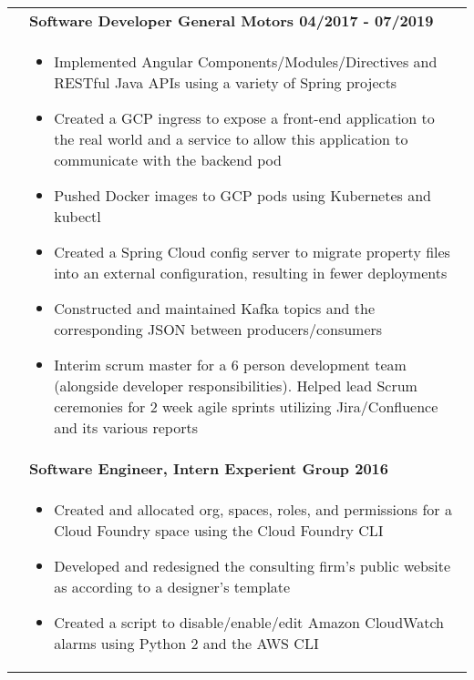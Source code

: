 \documentclass[final]{letter}
\begin{document}
\begin{center}
\begin{tabularx}{\linewidth}{>{\raggedright\bf\Large{}}p{10.75em}X}
			& \large\bf{Software Developer \hfill {General Motors} \hfill 04/2017 - 07/2019} \\
			& \begin{itemize}[noitemsep,topsep=0pt]\setlength\itemsep{2px}
				\item Implemented Angular Components/Modules/Directives and RESTful Java APIs using a variety of Spring projects  
				\item Created a GCP ingress to expose a front-end application to the real world and a service to allow this application to communicate with the backend pod
				\item Pushed Docker images to GCP pods using Kubernetes and kubectl
				\item Created a Spring Cloud config server to migrate property files into an external configuration, resulting in fewer deployments
				\item Constructed and maintained Kafka topics and the corresponding JSON between producers/consumers
				\item Interim scrum master for a 6 person development team (alongside developer responsibilities). Helped lead Scrum ceremonies for 2 week agile sprints utilizing Jira/Confluence and its various reports
			\end{itemize} \\
		
			& \large\bf{Software Engineer, Intern \hfill {Experient Group} \hfill 2016} \\
			& \begin{itemize}[noitemsep,topsep=0pt]\setlength\itemsep{2px}
				\item Created and allocated org, spaces, roles, and permissions for a Cloud Foundry space using the Cloud Foundry CLI
				\item Developed and redesigned the consulting firm's public website as according to a designer's template
				\item Created a script to disable/enable/edit Amazon CloudWatch alarms using Python 2 and the AWS CLI
			\end{itemize} \\
		\end{tabularx} \\


\end{center}
\end{document}
